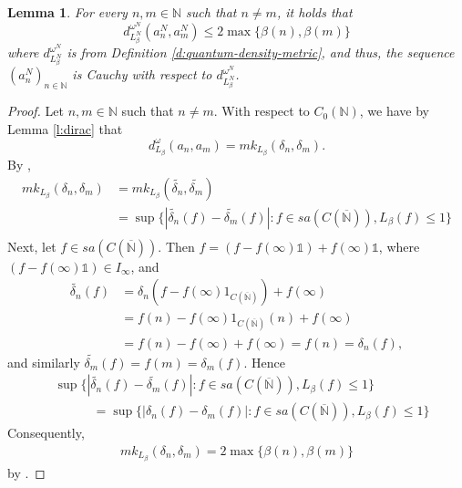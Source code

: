 \documentclass{amsart}
\theoremstyle{plain}
\newtheorem{lemma}[theorem]{Lemma}
\theoremstyle{definition}
\theoremstyle{remark}
\numberwithin{equation}{section}
\newcommand{\wt}[1]{{\widetilde{#1}}}
\newcommand{\be}{{\beta}}
\newcommand{\om}{{\omega}}
\newcommand{\de}{{\delta}}
\newcommand{\N}{{\mathds{N}}}
\renewcommand{\leq}{\leqslant}
\begin{document}
\begin{lemma}\label{l:qm-calc}
    For every $n,m\in \N$ such that $n \neq m$, it holds that 
    \[
 d_{L_{\be}^N}^{\om^N}(a_n^N, a_m^N) \leq 2\max\{\be(n), \be(m)\}
    \]
    where $d_{L_{\be}^N}^{\om^N}$ is from Definition \ref{d:quantum-density-metric}, and thus, the sequence  $(a_n^N)_{n\in \N}$ is Cauchy with respect to $  d_{L_{\be}^N}^{\om^N}$.
\end{lemma}
\begin{proof}
    Let $n,m \in \N$ such that $n\neq m$.  With respect to $C_0(\N)$, we have by Lemma \ref{l:dirac} that 
    \[
    d_{L_\be}^\om(a_n,a_m)=mk_{L_\be}(\de_n,\de_m).
    \]
  By \cite[Remark 2.9]{Latremoliere12b},
    \begin{align*}
    mk_{L_\be}(\de_n,\de_m)&= mk_{L_\be}(\wt{\de_n},\wt{\de_m})\\
    & =  \sup\{|\wt{\de_n}(f)-\wt{\de_m}(f)| : f\in sa(C(\overline{\N})), L_\be(f)\leq 1\}\\
    \end{align*} 
Next, let $f\in sa(C(\overline{\N}))$. Then $f=(f-f(\infty)\mathds{1})+f(\infty)\mathds{1}$, where $(f-f(\infty)\mathds{1})\in I_\infty$, 
 and
 \begin{align*}
 \wt{\de_n}(f)& =\de_n(f-f(\infty)1_{C(\overline{\N})})+f(\infty)\\
 & =f(n)-f(\infty)1_{C(\overline{\N})}(n)+f(\infty)\\
 & =f(n)-f(\infty)+f(\infty)=f(n)=\de_n(f),
 \end{align*}
 and similarly $\wt{\de_m}(f)=f(m)=\de_m(f)$.  
 Hence 
\begin{align*}
& \sup\{|\wt{\de_n}(f)-\wt{\de_m}(f)| : f\in sa(C(\overline{\N})), L_\be(f)\leq 1\}\\
& \quad \quad \quad =\sup\{|\de_n(f)-\de_m(f)| : f\in sa(C(\overline{\N})), L_\be(f)\leq 1\}
\end{align*}
Consequently,
    \begin{align*}    mk_{L_\be}(\de_n,\de_m)  =2\max \{\be(n), \be(m)\}
    \end{align*}
    by \cite[Lemma 3.2]{Aguilar-vBH-L}.
    

\end{proof}
\end{document}
